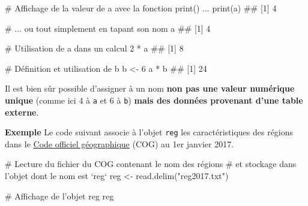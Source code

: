 \documentclass[12pt,twosided, notitlepage]{book}
\newenvironment{Shaded}{}{}
\newcommand{\KeywordTok}[1]{\textcolor[rgb]{0.00,0.00,1.00}{#1}}
\newcommand{\DecValTok}[1]{#1}
\newcommand{\StringTok}[1]{\textcolor[rgb]{0.00,0.50,0.50}{#1}}
\newcommand{\CommentTok}[1]{\textcolor[rgb]{0.00,0.50,0.00}{#1}}
\newcommand{\OperatorTok}[1]{#1}
\newcommand{\NormalTok}[1]{#1}
\renewenvironment{Shaded}{\begin{snugshade}}{\end{snugshade}}
\begin{document}
\begin{Shaded}
\begin{Highlighting}[]
\CommentTok{# Affichage de la valeur de a avec la fonction print() ...}
\KeywordTok{print}\NormalTok{(a)}
\NormalTok{  ## [1] 4}

\CommentTok{# ... ou tout simplement en tapant son nom}
\NormalTok{a}
\NormalTok{  ## [1] 4}

\CommentTok{# Utilisation de a dans un calcul}
\DecValTok{2} \OperatorTok{*}\StringTok{ }\NormalTok{a}
\NormalTok{  ## [1] 8}

\CommentTok{# Définition et utilisation de b}
\NormalTok{b <-}\StringTok{ }\DecValTok{6}
\NormalTok{a }\OperatorTok{*}\StringTok{ }\NormalTok{b}
\NormalTok{  ## [1] 24}
\end{Highlighting}
\end{Shaded}

Il est bien sûr possible d'assigner à un nom \textbf{non pas une valeur
numérique unique} (comme ici 4 à \texttt{a} et 6 à \texttt{b})
\textbf{mais des données provenant d'une table externe}.

\textbf{Exemple} Le code suivant associe à l'objet \texttt{reg} les
caractéristiques des régions dans le
\href{https://www.insee.fr/fr/information/2666684}{Code officiel
géographique} (COG) au 1er janvier 2017.


\begin{Shaded}
\begin{Highlighting}[]
\CommentTok{# Lecture du fichier du COG contenant le nom des régions}
\CommentTok{# et stockage dans l'objet dont le nom est `reg`}
\NormalTok{reg <-}\StringTok{ }\KeywordTok{read.delim}\NormalTok{(}\StringTok{"reg2017.txt"}\NormalTok{)}
\end{Highlighting}
\end{Shaded}

\begin{Shaded}
\begin{Highlighting}[]
\CommentTok{# Affichage de l'objet reg}
\NormalTok{reg}
\end{Highlighting}
\end{Shaded}
\end{document}
